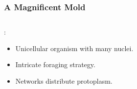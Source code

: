 \documentclass[	hyperref={pdfpagelabels=false}, xcolor=dvipsnames,
		11pt]{beamer}
\begin{document}
\begin{frame}
    \frametitle{A Magnificent Mold} 

	\begin{columns}
	\begin{column}{5cm}

	\begin{overprint}

		\begin{block}{\Pp:}
		  \begin{itemize}
		   \item<2> Unicellular organism with many nuclei.
		   \item<3> Intricate foraging strategy.
		   \item<4> Networks distribute protoplasm.
		  \end{itemize}
		\end{block}

	\end{overprint}

	\end{column}

	\begin{column}{5cm}
	\begin{overprint}

	\testbox{
	\begin{minipage}[t]{5 cm}


\end{minipage}}
\end{overprint}
\end{column}
\end{columns}
\end{frame}
\end{document}
